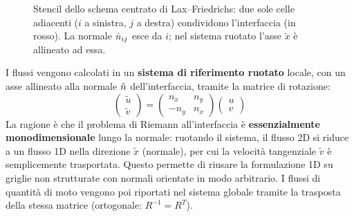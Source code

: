 \begin{figure}[H]
\centering
{}
\caption{Stencil dello schema centrato di Lax--Friedrichs: due sole celle adiacenti
($i$ a sinistra, $j$ a destra) condividono l'interfaccia (in rosso). La normale
$\hat{n}_{ij}$ esce da $i$; nel sistema ruotato l'asse $\tilde x$ è allineato ad essa.}
\end{figure}

I flussi vengono calcolati in un \textbf{sistema di riferimento ruotato} locale, con un
asse allineato alla normale $\hat{n}$ dell'interfaccia, tramite la matrice di rotazione:
\begin{equation}
  \begin{pmatrix} \tilde{u} \\ \tilde{v} \end{pmatrix} =
  \begin{pmatrix} n_x & n_y \\ -n_y & n_x \end{pmatrix}
  \begin{pmatrix} u \\ v \end{pmatrix}
\end{equation}
La ragione è che il problema di Riemann all'interfaccia è \textbf{essenzialmente
mono\-dimensionale} lungo la normale: ruotando il sistema, il flusso 2D si riduce a un
flusso 1D nella direzione $\tilde x$ (normale), per cui la velocità tangenziale
$\tilde v$ è semplicemente trasportata. Questo permette di riusare la formulazione 1D
su griglie non strutturate con normali orientate in modo arbitrario. I flussi di
quantità di moto vengono poi riportati nel sistema globale tramite la trasposta della
stessa matrice (ortogonale: $R^{-1} = R^T$).

